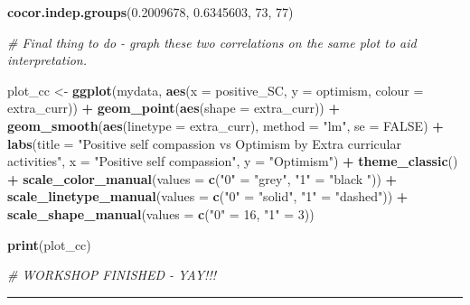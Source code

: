 \documentclass[
]{book}
\newenvironment{Shaded}{\begin{snugshade}}{\end{snugshade}}
\newcommand{\AttributeTok}[1]{\textcolor[rgb]{0.13,0.29,0.53}{#1}}
\newcommand{\CommentTok}[1]{\textcolor[rgb]{0.56,0.35,0.01}{\textit{#1}}}
\newcommand{\ConstantTok}[1]{\textcolor[rgb]{0.56,0.35,0.01}{#1}}
\newcommand{\DecValTok}[1]{\textcolor[rgb]{0.00,0.00,0.81}{#1}}
\newcommand{\FloatTok}[1]{\textcolor[rgb]{0.00,0.00,0.81}{#1}}
\newcommand{\FunctionTok}[1]{\textcolor[rgb]{0.13,0.29,0.53}{\textbf{#1}}}
\newcommand{\NormalTok}[1]{#1}
\newcommand{\OtherTok}[1]{\textcolor[rgb]{0.56,0.35,0.01}{#1}}
\newcommand{\SpecialCharTok}[1]{\textcolor[rgb]{0.81,0.36,0.00}{\textbf{#1}}}
\newcommand{\StringTok}[1]{\textcolor[rgb]{0.31,0.60,0.02}{#1}}
\begin{document}
\begin{Shaded}
\begin{Highlighting}[]
\FunctionTok{cocor.indep.groups}\NormalTok{(}\FloatTok{0.2009678}\NormalTok{, }\FloatTok{0.6345603}\NormalTok{, }\DecValTok{73}\NormalTok{, }\DecValTok{77}\NormalTok{)}

\CommentTok{\# Final thing to do {-} graph these two correlations on the same plot to aid interpretation.}

\NormalTok{plot\_cc }\OtherTok{\textless{}{-}} \FunctionTok{ggplot}\NormalTok{(mydata, }\FunctionTok{aes}\NormalTok{(}\AttributeTok{x =}\NormalTok{ positive\_SC, }\AttributeTok{y =}\NormalTok{ optimism, }\AttributeTok{colour =}\NormalTok{ extra\_curr)) }\SpecialCharTok{+}
  \FunctionTok{geom\_point}\NormalTok{(}\FunctionTok{aes}\NormalTok{(}\AttributeTok{shape =}\NormalTok{ extra\_curr)) }\SpecialCharTok{+}
  \FunctionTok{geom\_smooth}\NormalTok{(}\FunctionTok{aes}\NormalTok{(}\AttributeTok{linetype =}\NormalTok{ extra\_curr), }\AttributeTok{method =} \StringTok{"lm"}\NormalTok{, }\AttributeTok{se =} \ConstantTok{FALSE}\NormalTok{) }\SpecialCharTok{+}
  \FunctionTok{labs}\NormalTok{(}\AttributeTok{title =} \StringTok{"Positive self compassion vs Optimism by Extra curricular activities"}\NormalTok{,}
       \AttributeTok{x =} \StringTok{"Positive self compassion"}\NormalTok{,}
       \AttributeTok{y =} \StringTok{"Optimism"}\NormalTok{) }\SpecialCharTok{+}
  \FunctionTok{theme\_classic}\NormalTok{() }\SpecialCharTok{+}
  \FunctionTok{scale\_color\_manual}\NormalTok{(}\AttributeTok{values =} \FunctionTok{c}\NormalTok{(}\StringTok{"0"} \OtherTok{=} \StringTok{"grey"}\NormalTok{, }\StringTok{"1"} \OtherTok{=} \StringTok{"black "}\NormalTok{)) }\SpecialCharTok{+}
  \FunctionTok{scale\_linetype\_manual}\NormalTok{(}\AttributeTok{values =} \FunctionTok{c}\NormalTok{(}\StringTok{"0"} \OtherTok{=} \StringTok{"solid"}\NormalTok{, }\StringTok{"1"} \OtherTok{=} \StringTok{"dashed"}\NormalTok{)) }\SpecialCharTok{+}
  \FunctionTok{scale\_shape\_manual}\NormalTok{(}\AttributeTok{values =} \FunctionTok{c}\NormalTok{(}\StringTok{"0"} \OtherTok{=} \DecValTok{16}\NormalTok{, }\StringTok{"1"} \OtherTok{=} \DecValTok{3}\NormalTok{))}

                     
\FunctionTok{print}\NormalTok{(plot\_cc)}

\CommentTok{\# WORKSHOP FINISHED {-} YAY!!!}
\end{Highlighting}
\end{Shaded}

\begin{center}\rule{0.5\linewidth}{0.5pt}\end{center}
\end{document}
